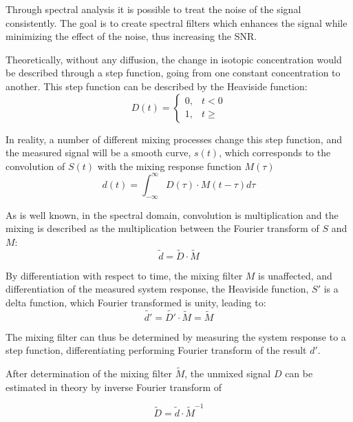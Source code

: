 \documentclass[../../CompleteThesis2/Complete_2ndDraft]{subfiles}
\begin{document}
Through spectral analysis it is possible to treat the noise of the signal consistently. The goal is to create spectral filters which enhances the signal while minimizing the effect of the noise, thus increasing the SNR.

Theoretically, without any diffusion, the change in isotopic concentration would be described through a step function, going from one constant concentration to another. This step function can be described by the Heaviside function:
\begin{equation}
	D(t) = \begin{cases}
		0, & t < 0 \\
		1, & t \geq
	\end{cases}
\end{equation}

In reality, a number of different mixing processes change this step function, and the measured signal will be a smooth curve, $s(t)$, which corresponds to the convolution of $S(t)$ with the mixing response function $M(\tau)$
\begin{equation}
	d(t) = \int_{- \infty}^{\infty} D(\tau) \cdot M(t - \tau)d\tau
\end{equation}

As is well known, in the spectral domain, convolution is multiplication and the mixing is described as the multiplication between the Fourier transform of $S$ and $M$:
\begin{equation}
	\tilde{d} = \tilde{D} \cdot \tilde{M}
\end{equation}


By differentiation with respect to time, the mixing filter $M$ is unaffected, and differentiation of the measured system response, the Heaviside function, $S'$ is a delta function, which Fourier transformed is unity, leading to:
\begin{equation}
	\tilde{d'} = \tilde{D'} \cdot \tilde{M} = \tilde{M}
\end{equation}

The mixing filter can thus be determined by measuring the system response to a step function, differentiating performing Fourier transform of the result $d'$.

After determination of the mixing filter $\tilde{M}$, the unmixed signal $D$ can be estimated in theory by inverse Fourier transform of


\begin{equation}
	\tilde{D} = \tilde{d}\cdot\tilde{M}^{-1}
	\label{eq:Restoration}
\end{equation}
\end{document}
